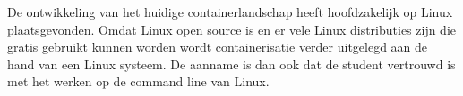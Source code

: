 De ontwikkeling van het huidige containerlandschap heeft hoofdzakelijk op Linux plaatsgevonden. Omdat Linux open source is en er vele Linux distributies zijn die gratis gebruikt kunnen worden wordt containerisatie verder uitgelegd aan de hand van een Linux systeem. De aanname is dan ook dat de student vertrouwd is met het werken op de command line van Linux.
